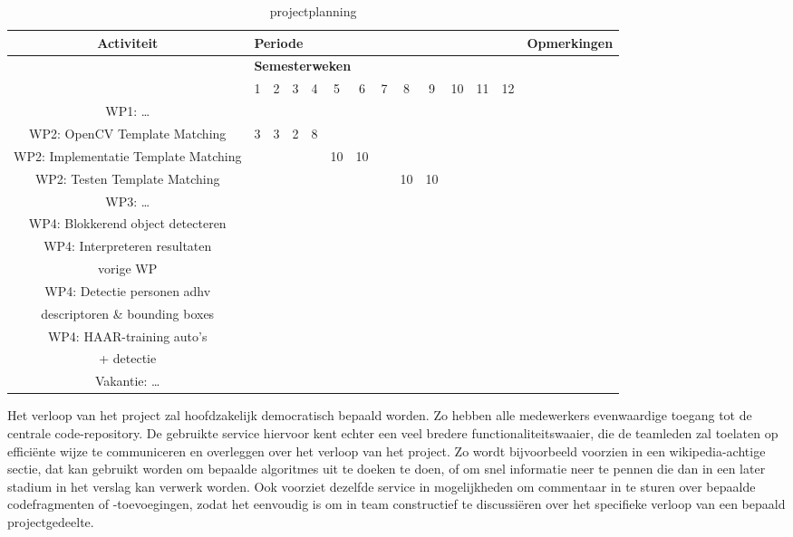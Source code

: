 \documentclass[a4paper,oneside,11pt,final]{memoir}
\begin{document}
\begin{table}[h]
	\centering
		\begin{tabular}{|*{14}{c|}}
		\hline
		\textbf{Activiteit} & \multicolumn{12}{l|}{\textbf{Periode}} & \textbf{Opmerkingen} \\
		\hline
							 & \multicolumn{12}{l|}{\textbf{Semesterweken}} &   \\
		\hline 
		  & 1	& 2	& 3	& 4	& 5	& 6	& 7	& 8	& 9	& 10 & 11	& 12 & \\
		\hline 
		WP1: \ldots &  &  &  &  & & & & & & & & & \\
		\hline 
		WP2: OpenCV Template Matching &  3 & 3 & 2 & 8 & & & & & & & & & \\
		\hline 
		WP2: Implementatie Template Matching & & & & &10&10& & & & & & & \\
		\hline 
		WP2: Testen Template Matching & & & & & & & &10&10&& & &\\
		\hline 
		WP3: \ldots & & & & & & & & & & & & & \\
		\hline 
		WP4: Blokkerend object detecteren& & & & & & & & & & & & & \\
		\hline
		WP4: Interpreteren resultaten & & & & & & & & & & & & & \\
		vorige WP& & & & & & & & & & & & & \\
		\hline
		WP4: Detectie personen adhv & & & & & & & & & & & & & \\
		 descriptoren \& bounding boxes& & & & & & & & & & & & & \\
		\hline
		WP4: HAAR-training auto's & & & & & & & & & & & & & \\
		+ detectie & & & & & & & & & & & & & \\
		\hline 
		Vakantie: \ldots & & & & & & & & & & & & & \\
		\hline
		\end{tabular}
	\caption{projectplanning}
	\label{tab:projectplanning}
\end{table}
																							


Het verloop van het project zal hoofdzakelijk democratisch bepaald worden. Zo hebben alle medewerkers evenwaardige toegang tot de centrale code-repository. De gebruikte service hiervoor kent echter een veel bredere functionaliteitswaaier, die de teamleden zal toelaten op efficiënte wijze te communiceren en overleggen over het verloop van het project. Zo wordt bijvoorbeeld voorzien in een wikipedia-achtige sectie, dat kan gebruikt worden om bepaalde algoritmes uit te doeken te doen, of om snel informatie neer te pennen die dan in een later stadium in het verslag kan verwerk worden. Ook voorziet dezelfde service in mogelijkheden om commentaar in te sturen over bepaalde codefragmenten of -toevoegingen, zodat het eenvoudig is om in team constructief te discussiëren over het specifieke verloop van een bepaald projectgedeelte.
\end{document}
